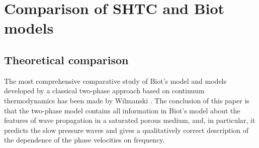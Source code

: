 \documentclass[3p,times,table]{article}
\begin{document}

\section{Comparison of SHTC and Biot models}\label{Comparison}

\subsection{Theoretical comparison}


The most comprehensive comparative study of Biot's model and models developed 
by a classical two-phase approach based on continuum thermodynamics has  
been made by Wilmanski \cite{Wilmanski2006}.
The conclusion of this paper is that the two-phase model contains all 
information in Biot's model about the features of wave propagation in a saturated porous 
medium, and, in particular, it predicts the slow pressure 
waves and gives a qualitatively correct description of the dependence of the phase 
velocities on frequency.  
\end{document}
